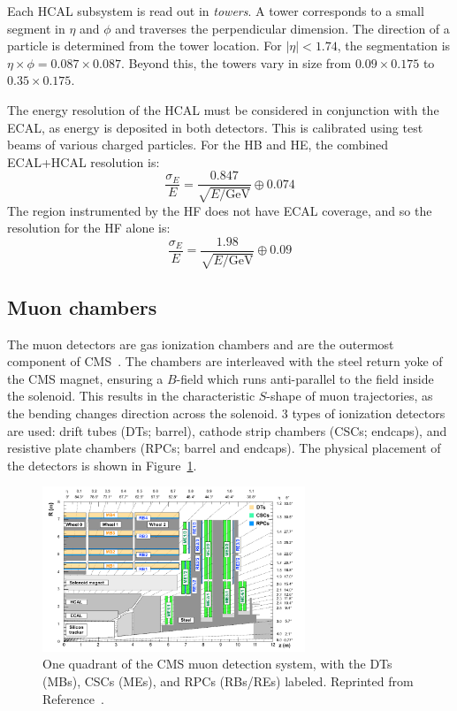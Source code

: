 Each HCAL subsystem is read out in \emph{towers}.
A tower corresponds to a small segment in $\eta$ and $\phi$ and traverses the perpendicular dimension.
The direction of a particle is determined from the tower location.
For $|\eta|<1.74$, the segmentation is $\eta\times\phi = 0.087\times0.087$.
Beyond this, the towers vary in size from $0.09\times0.175$  to $0.35\times0.175$.

The energy resolution of the HCAL must be considered in conjunction with the ECAL, as energy is deposited in both detectors.
This is calibrated using test beams of various charged particles.
For the HB and HE, the combined ECAL+HCAL resolution is:
\begin{equation}
    \frac{\sigma_E}{E} = \frac{0.847}{\sqrt{E/\mathrm{GeV}}} \oplus 0.074
\end{equation}
The region instrumented by the HF does not have ECAL coverage, and so the resolution for the HF alone is:
\begin{equation}
    \frac{\sigma_E}{E} = \frac{1.98}{\sqrt{E/\mathrm{GeV}}} \oplus 0.09
\end{equation}

\subsection{Muon chambers}

The muon detectors are gas ionization chambers and are the outermost component of CMS~\cite{cmsmuon}. 
The chambers are interleaved with the steel return yoke of the CMS magnet, ensuring a $B$-field which runs anti-parallel to the field inside the solenoid.
This results in the characteristic $S$-shape of muon trajectories, as the bending changes direction across the solenoid. 
3 types of ionization detectors are used: drift tubes (DTs; barrel), cathode strip chambers (CSCs; endcaps), and resistive plate chambers (RPCs; barrel and endcaps).
The physical placement of the detectors is shown in Figure~\ref{fig:cms:muondet}.

\begin{figure}[]
    \begin{center}
        \includegraphics[width=0.7\textwidth]{figures/cms/muon.png}
        \caption{One quadrant of the CMS muon detection system, with the DTs (MBs), CSCs (MEs), and RPCs (RBs/REs) labeled. 
                 Reprinted from Reference~\cite{cmsmuon}.}
        \label{fig:cms:muondet}
    \end{center}
\end{figure}

